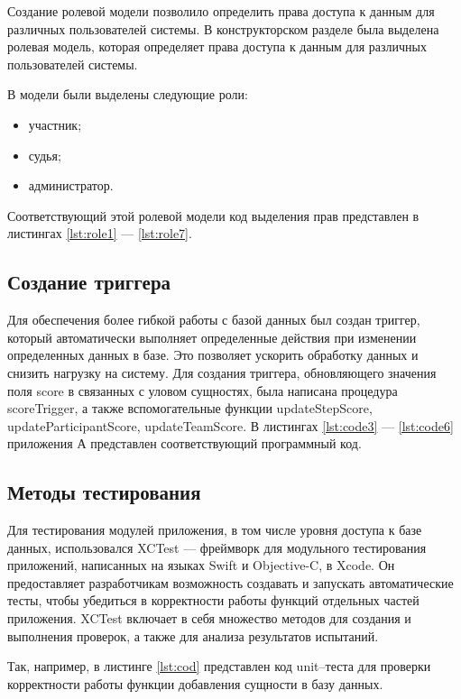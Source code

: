Создание ролевой модели позволило определить права доступа к данным для различных пользователей системы. В конструкторском разделе была выделена ролевая модель, которая определяет права доступа к данным для различных пользователей системы.

В модели были выделены следующие роли:
\begin{itemize}[label=---]
	\item участник;
	\item судья;
	\item администратор.
\end{itemize}

Соответствующий этой ролевой модели код выделения прав представлен в листингах \ref{lst:role1} --- \ref{lst:role7}.

\subsection{Создание триггера}

Для обеспечения более гибкой работы с базой данных был создан триггер, который автоматически выполняет определенные действия при изменении определенных данных в базе. Это позволяет ускорить обработку данных и снизить нагрузку на систему. Для создания триггера, обновляющего значения поля score в связанных с уловом сущностях, была написана процедура  scoreTrigger, а также вспомогательные функции updateStepScore, updateParticipantScore, updateTeamScore. В листингах \ref{lst:code3} ---  \ref{lst:code6} приложения А представлен соответствующий программный код.

\subsection{Методы тестирования}

Для тестирования модулей приложения, в том числе уровня доступа к базе данных, использовался XCTest \cite{xctest} --- фреймворк для модульного тестирования приложений, написанных на языках Swift и Objective-C, в Xcode. Он предоставляет разработчикам возможность создавать и запускать автоматические тесты, чтобы убедиться в корректности работы функций отдельных частей приложения. XCTest включает в себя множество методов для создания и выполнения проверок, а также для анализа результатов испытаний. 

Так, например, в листинге \ref{lst:cod} представлен код unit--теста для проверки корректности работы функции добавления сущности в базу данных.

